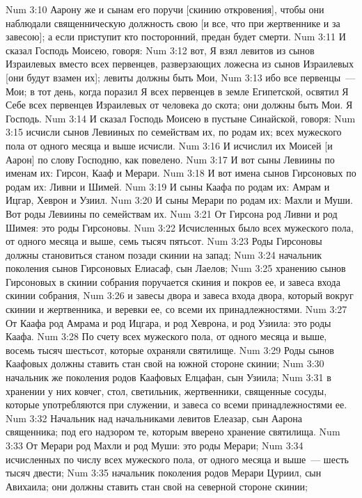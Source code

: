 \vs Num 3:10 Аарону же и сынам его поручи [скинию откровения], чтобы они наблюдали священническую должность свою [и все, что при жертвеннике и за завесою]; а если приступит кто посторонний, предан будет смерти.
\rsbpar\vs Num 3:11 И сказал Господь Моисею, говоря:
\vs Num 3:12 вот, Я взял левитов из сынов Израилевых вместо всех первенцев, разверзающих ложесна из сынов Израилевых [они будут взамен их]; левиты должны быть Мои,
\vs Num 3:13 ибо все первенцы~--- Мои; в тот день, когда поразил Я всех первенцев в земле Египетской, освятил Я Себе всех первенцев Израилевых от человека до скота; они должны быть Мои. Я Господь.
\rsbpar\vs Num 3:14 И сказал Господь Моисею в пустыне Синайской, говоря:
\vs Num 3:15 исчисли сынов Левииных по семействам их, по родам их; всех мужеского пола от одного месяца и выше исчисли.
\vs Num 3:16 И исчислил их Моисей [и Аарон] по слову Господню, как повелено.
\vs Num 3:17 И вот сыны Левиины по именам их: Гирсон, Кааф и Мерари.
\vs Num 3:18 И вот имена сынов Гирсоновых по родам их: Ливни и Шимей.
\vs Num 3:19 И сыны Каафа по родам их: Амрам и Ицгар, Хеврон и Узиил.
\vs Num 3:20 И сыны Мерари по родам их: Махли и Муши. Вот роды Левиины по семействам их.
\vs Num 3:21 От Гирсона род Ливни и род Шимея: это роды Гирсоновы.
\vs Num 3:22 Исчисленных было всех мужеского пола, от одного месяца и выше, семь тысяч пятьсот.
\vs Num 3:23 Роды Гирсоновы должны становиться станом позади скинии на запад;
\vs Num 3:24 начальник поколения сынов Гирсоновых Елиасаф, сын Лаелов;
\vs Num 3:25 хранению сынов Гирсоновых в скинии собрания поручается скиния и покров ее, и завеса входа скинии собрания,
\vs Num 3:26 и завесы двора и завеса входа двора, который вокруг скинии и жертвенника, и веревки ее, со всеми их принадлежностями.
\vs Num 3:27 От Каафа род Амрама и род Ицгара, и род Хеврона, и род Узиила: это роды Каафа.
\vs Num 3:28 По счету всех мужеского пола, от одного месяца и выше, восемь тысяч шестьсот, которые охраняли святилище.
\vs Num 3:29 Роды сынов Каафовых должны ставить стан свой на южной стороне скинии;
\vs Num 3:30 начальник же поколения родов Каафовых Елцафан, сын Узиила;
\vs Num 3:31 в хранении у них ковчег, стол, светильник, жертвенники, священные сосуды, которые употребляются при служении, и завеса со всеми принадлежностями ее.
\vs Num 3:32 Начальник над начальниками левитов Елеазар, сын Аарона священника; под его надзором те, которым вверено хранение святилища.
\vs Num 3:33 От Мерари род Махли и род Муши: это роды Мерари;
\vs Num 3:34 исчисленных по числу всех мужеского пола, от одного месяца и выше~--- шесть тысяч двести;
\vs Num 3:35 начальник поколения родов Мерари Цуриил, сын Авихаила; они должны ставить стан свой на северной стороне скинии;
